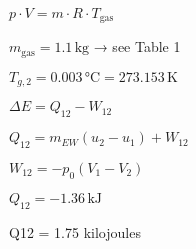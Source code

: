 \( p \cdot V = m \cdot R \cdot T_{\text{gas}} \)

\( m_{\text{gas}} = 1.1 \, \text{kg} \) → see Table 1

\( T_{g,2} = 0.003 \, \text{°C} = 273.153 \, \text{K} \)  

\( \Delta E = Q_{12} - W_{12} \)  

\( Q_{12} = m_{EW} (u_{2} - u_{1}) + W_{12} \)  

\( W_{12} = - p_{0} (V_{1} - V_{2}) \)  

\( Q_{12} = - 1.36 \, \text{kJ} \)

Q12 = 1.75 kilojoules